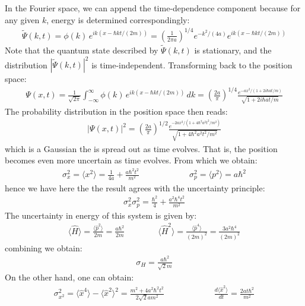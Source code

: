 \documentclass[11pt]{book}
\theoremstyle{break}
\theoremstyle{break}
\newcommand{\that}[1]{\widetilde{#1}}
\begin{document}
In the Fourier space, we can append the time-dependence component because for any given $k$, energy is determined correspondingly:
\begin{align*}
\that{\Psi}(k,t) = \phi(k) \, e^{ik(x - \hbar k t/(2m))} = \left( \frac{1}{2\pi a}\right)^{1/4}e^{-k^2/(4a)}e^{ik(x-\hbar kt/(2m))}
\end{align*}
Note that the quantum state described by $\that{\Psi}(k,t)$ is stationary, and the distribution $|\that{\Psi}(k,t)|^2$ is time-independent. Transforming back to the position space:
\begin{align*}
\Psi(x,t) = \frac{1}{\sqrt{2\pi}} \int_{-\infty}^\infty \phi(k) \, e^{ik(x- \hbar kt/(2m))} \, dk = \left( \frac{2a}{\pi}\right)^{1/4} \frac{e^{-ax^2/(1+2i\hbar at/m)}}{\sqrt{1+2i \hbar at/m}}
\end{align*}
The probability distribution in the position space then reads:
\begin{align*}
|\Psi(x,t)|^2 = \left( \frac{2a}{\pi}\right)^{1/2}\frac{e^{-2ax^2/(1+4\hbar^2 a^2 t^2/m^2)}}{\sqrt{1+4\hbar^2 a^2 t^2 / m^2}}
\end{align*}
which is a Gaussian the is spread out as time evolves. That is, the position becomes even more uncertain as time evolves. From which we obtain:
\begin{align*}
\sigma_x^2 =  \langle x^2\rangle = \frac{1}{4a} + \frac{a\hbar^2 t^2}{m^2 }\qquad\qquad\qquad \sigma_p^2 = \langle p^2\rangle = a\hbar^2
\end{align*}
hence we have here the the result agrees with the uncertainty principle:
\begin{align*}
\sigma_x^2 \sigma_p^2 = \frac{\hbar^2}{4} + \frac{a^2 \hbar^4 t^2}{m^2}
\end{align*}
The uncertainty in energy of this system is given by:
\begin{align*}
 \langle \hat{H}\rangle = \frac{\langle \hat{p}^2 \rangle}{2m} = \frac{a\hbar^2}{2m} \qquad\qquad \langle \hat{H}^2\rangle = \frac{\langle \hat{p}^4\rangle}{(2m)^2} = \frac{3a^2 \hbar^4}{(2m)^2} 
\end{align*}
combining we obtain:
\begin{align*}
\sigma_H = \frac{a\hbar^2}{\sqrt{2}m}
\end{align*}
On the other hand, one can obtain:
\begin{align*}
\sigma_{x^2}^2 = \langle \hat{x}^4\rangle - \langle \hat{x}^2 \rangle^2 = \frac{m^2 + 4a^2 \hbar^2 t^2}{2\sqrt{2} am^2} \qquad\qquad\qquad \frac{d\langle \hat{x}^2\rangle}{dt} = \frac{2at\hbar^2}{m^2}
\end{align*}
\end{document}
